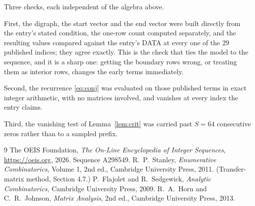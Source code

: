 \documentclass[11pt,a4paper]{article}
\theoremstyle{plain}
\theoremstyle{definition}
\begin{document}
Three checks, each independent of the algebra above.

First, the digraph, the start vector and the end vector were built directly from the
entry's stated condition, the one-row count computed separately, and the resulting values
compared against the entry's DATA at every one of the $29$ published indices; they
agree exactly. This is the check that ties the model to the sequence, and it is a sharp one:
getting the boundary rows wrong, or treating them as interior rows, changes the early terms
immediately.

Second, the recurrence \eqref{eq:conj} was evaluated on those published terms in exact
integer arithmetic, with no matrices involved, and vanishes at every index the entry claims.

Third, the vanishing test of Lemma~\ref{lem:crit} was carried past $S=64$ consecutive
zeros rather than to a sampled prefix.

\begin{thebibliography}{9}
 The OEIS Foundation, \emph{The On-Line Encyclopedia of Integer
Sequences}, \url{https://oeis.org}, 2026. Sequence A298549.
 R.~P.~Stanley, \emph{Enumerative Combinatorics}, Volume 1, 2nd ed.,
Cambridge University Press, 2011. (Transfer-matrix method, Section 4.7.)
 P.~Flajolet and R.~Sedgewick, \emph{Analytic Combinatorics}, Cambridge
University Press, 2009.
 R.~A.~Horn and C.~R.~Johnson, \emph{Matrix Analysis}, 2nd ed., Cambridge
University Press, 2013.
\end{thebibliography}
\end{document}
